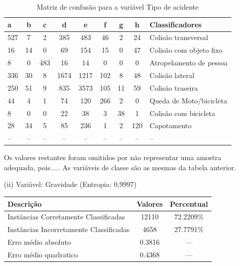 \begin{enumerate}
		\begin{table}[!ht]
			\centering
			\caption{Matriz de confusão para a variável Tipo de acidente}
			\vspace{1mm}
			\begin{tabular}{l|c|c|c|c|c|c|c|l}
				\hline
				\textbf{a} & \textbf{b} & \textbf{c} & \textbf{d} & \textbf{e} & \textbf{f} & \textbf{g} & \textbf{h} & \textbf{Classificadores}\\
				\hline
				527 & 7 & 2 & 385 & 483 & 46 & 2 & 24 & Colisão transversal \\
				16 & 14 & 0 & 69 & 154 & 15 & 0 & 47 & Colisão com objeto fixo \\
				8 & 0 & 483 & 16 & 14 & 0 & 0 & 0 & Atropelamento de pessoa \\
				336 & 30 & 8 & 1674 & 1217 & 102 & 8 & 48 & Colisão lateral \\
				250 & 51 & 9 & 835 & 3573 & 105 & 11 & 59 & Colisão traseira \\
				44 & 4 & 1 & 74 & 120 & 266 & 2 & 0 & Queda de Moto/bicicleta \\
				8 & 0 & 0 & 22 & 38 & 3 & 38 & 1 & Colisão com bicicleta \\
				28 & 34 & 5 & 85 & 236 & 1 & 2 & 120 & Capotamento \\
				-- & -- & -- & -- & -- & -- & -- & -- & -- \\	
			\end{tabular}
		\end{table}
		
		Os valores restantes foram omitidos por não representar uma amostra
		adequada, pois..... As variáveis de classe são as mesmas da tabela
		anterior. \\
					
	\item[(ii)] Variável: Gravidade (Entropia: 0,9997)
	\begin{table}[!ht]
		\centering
		\vspace{1mm}
		\begin{tabular}{l|c|c}
			\hline
			\textbf{Descrição} & \textbf{Valores} & \textbf{Percentual} \\
			\hline
			Instâncias Corretamente Classificadas & 12110 & 72.2209\% \\
			Instâncias Incorretamente Classificadas & 4658 & 27.7791\% \\
			Erro médio absoluto & 0.3816 & ---  \\
			Erro médio quadratico & 0.4368 & --- \\
		\end{tabular}
	\end{table}
	

\end{enumerate}
